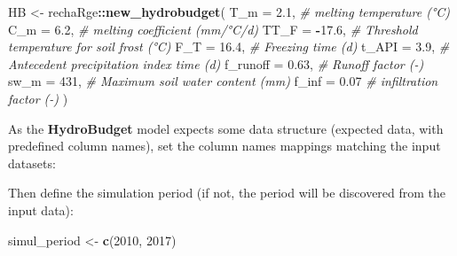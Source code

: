 \documentclass[
]{book}
\newenvironment{Shaded}{\begin{snugshade}}{\end{snugshade}}
\newcommand{\AttributeTok}[1]{\textcolor[rgb]{0.13,0.29,0.53}{#1}}
\newcommand{\CommentTok}[1]{\textcolor[rgb]{0.56,0.35,0.01}{\textit{#1}}}
\newcommand{\DecValTok}[1]{\textcolor[rgb]{0.00,0.00,0.81}{#1}}
\newcommand{\FloatTok}[1]{\textcolor[rgb]{0.00,0.00,0.81}{#1}}
\newcommand{\FunctionTok}[1]{\textcolor[rgb]{0.13,0.29,0.53}{\textbf{#1}}}
\newcommand{\NormalTok}[1]{#1}
\newcommand{\OtherTok}[1]{\textcolor[rgb]{0.56,0.35,0.01}{#1}}
\newcommand{\SpecialCharTok}[1]{\textcolor[rgb]{0.81,0.36,0.00}{\textbf{#1}}}
\newcommand{\StringTok}[1]{\textcolor[rgb]{0.31,0.60,0.02}{#1}}
\begin{document}
\begin{Shaded}
\begin{Highlighting}[]
\NormalTok{HB }\OtherTok{\textless{}{-}}\NormalTok{ rechaRge}\SpecialCharTok{::}\FunctionTok{new\_hydrobudget}\NormalTok{(}
  \AttributeTok{T\_m =} \FloatTok{2.1}\NormalTok{, }\CommentTok{\# melting temperature (°C)}
  \AttributeTok{C\_m =} \FloatTok{6.2}\NormalTok{, }\CommentTok{\# melting coefficient (mm/°C/d)}
  \AttributeTok{TT\_F =} \SpecialCharTok{{-}}\FloatTok{17.6}\NormalTok{, }\CommentTok{\# Threshold temperature for soil frost (°C)}
  \AttributeTok{F\_T =} \FloatTok{16.4}\NormalTok{, }\CommentTok{\# Freezing time (d)}
  \AttributeTok{t\_API =} \FloatTok{3.9}\NormalTok{, }\CommentTok{\# Antecedent precipitation index time (d)}
  \AttributeTok{f\_runoff =} \FloatTok{0.63}\NormalTok{, }\CommentTok{\# Runoff factor ({-})}
  \AttributeTok{sw\_m =} \DecValTok{431}\NormalTok{, }\CommentTok{\# Maximum soil water content (mm)}
  \AttributeTok{f\_inf =} \FloatTok{0.07} \CommentTok{\# infiltration factor ({-})}
\NormalTok{)}
\end{Highlighting}
\end{Shaded}

As the \textbf{HydroBudget} model expects some data structure (expected data, with predefined column names), set the column names mappings matching the input datasets:

\begin{Shaded}
\end{Shaded}

Then define the simulation period (if not, the period will be discovered from the input data):

\begin{Shaded}
\begin{Highlighting}[]
\NormalTok{simul\_period }\OtherTok{\textless{}{-}} \FunctionTok{c}\NormalTok{(}\DecValTok{2010}\NormalTok{, }\DecValTok{2017}\NormalTok{)}
\end{Highlighting}
\end{Shaded}
\end{document}
